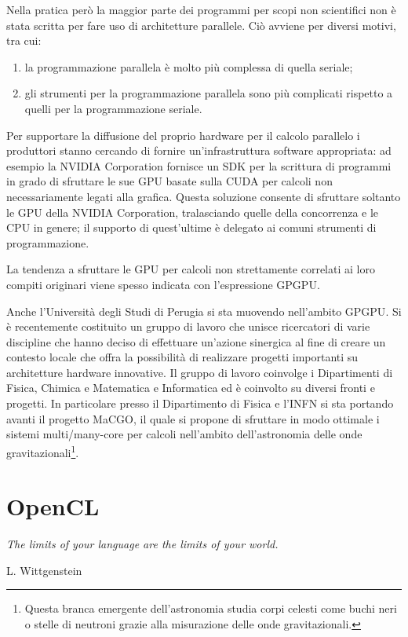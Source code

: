 \documentclass[12pt,a4paper,oneside]{book}
\begin{document}
Nella pratica però la maggior parte dei programmi per scopi non scientifici non è stata scritta per fare uso di architetture parallele. Ciò avviene per diversi motivi, tra cui:
\begin{enumerate}
\item la programmazione parallela è molto più complessa di quella seriale;
\item gli strumenti per la programmazione parallela sono più complicati rispetto a quelli per la programmazione seriale.
\end{enumerate}

Per supportare la diffusione del proprio hardware per il calcolo parallelo i produttori stanno cercando di fornire un'infrastruttura software appropriata: ad esempio la NVIDIA Corporation fornisce un \ac{SDK} per la scrittura di programmi in grado di sfruttare le sue \ac{GPU} basate sulla \ac{CUDA} per calcoli non necessariamente legati alla grafica. Questa soluzione consente di sfruttare soltanto le \ac{GPU} della NVIDIA Corporation, tralasciando quelle della concorrenza e le \ac{CPU} in genere; il supporto di quest'ultime è delegato ai comuni strumenti di programmazione.

La tendenza a sfruttare le \ac{GPU} per calcoli non strettamente correlati ai loro compiti originari viene spesso indicata con l'espressione \ac{GPGPU}.

Anche l'Università degli Studi di Perugia si sta muovendo nell'ambito \ac{GPGPU}. 
Si è recentemente costituito un gruppo di lavoro che unisce ricercatori di varie discipline che hanno deciso di effettuare un'azione sinergica al fine di creare un contesto locale che offra la possibilità di realizzare progetti importanti su architetture hardware innovative. Il gruppo di lavoro coinvolge i Dipartimenti di Fisica, Chimica e Matematica e Informatica ed è coinvolto su diversi fronti e progetti. In particolare presso il Dipartimento di Fisica e l'\ac{INFN} si sta portando avanti il progetto \ac{MaCGO}, il quale si propone di sfruttare in modo ottimale i sistemi multi/many-core per calcoli nell'ambito dell'astronomia delle onde gravitazionali\footnote{Questa branca emergente dell'astronomia studia corpi celesti come buchi neri o stelle di neutroni grazie alla misurazione delle onde gravitazionali.}.

\chapter{OpenCL}
\linespread{1}
\epigraph{\textit{The limits of your language are the limits of your world.}}{L. Wittgenstein}
\linespread{1.3}
\end{document}
